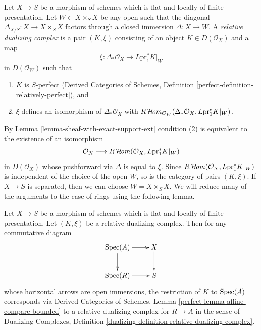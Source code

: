 \begin{definition}
\label{definition-relative-dualizing-complex}
Let $X \to S$ be a morphism of schemes which is flat and
locally of finite presentation. Let $W \subset X \times_S X$
be any open such that the diagonal $\Delta_{X/S} : X \to X \times_S X$
factors through a closed immersion $\Delta : X \to W$.
A {\it relative dualizing complex} is a
pair $(K, \xi)$ consisting of an object $K \in D(\mathcal{O}_X)$
and a map
$$
\xi : \Delta_*\mathcal{O}_X \longrightarrow L\text{pr}_1^*K|_W
$$
in $D(\mathcal{O}_W)$ such that
\begin{enumerate}
\item $K$ is $S$-perfect (Derived Categories of Schemes, Definition
\ref{perfect-definition-relatively-perfect}), and
\item $\xi$ defines an isomorphism of $\Delta_*\mathcal{O}_X$
with
$R\mathop{\mathcal{H}\!\mathit{om}}\nolimits_{\mathcal{O}_W}(
\Delta_*\mathcal{O}_X, L\text{pr}_1^*K|_W)$.
\end{enumerate}
\end{definition}

\noindent
By Lemma \ref{lemma-sheaf-with-exact-support-ext} condition (2)
is equivalent to the existence of an isomorphism
$$
\mathcal{O}_X \longrightarrow
R\mathop{\mathcal{H}\!\mathit{om}}\nolimits(\mathcal{O}_X, L\text{pr}_1^*K|_W)
$$
in $D(\mathcal{O}_X)$ whose pushforward via $\Delta$ is equal to $\xi$.
Since $R\mathop{\mathcal{H}\!\mathit{om}}\nolimits(\mathcal{O}_X, L\text{pr}_1^*K|_W)$ is independent
of the choice of the open $W$, so is the category of pairs $(K, \xi)$.
If $X \to S$ is separated, then we can choose $W = X \times_S X$.
We will reduce many of the arguments to the case of rings
using the following lemma.

\begin{lemma}
\label{lemma-relative-dualizing-complex-algebra}
Let $X \to S$ be a morphism of schemes which is flat and
locally of finite presentation. Let $(K, \xi)$ be a relative
dualizing complex. Then for any commutative diagram
$$
\xymatrix{
\Spec(A) \ar[d] \ar[r] & X \ar[d] \\
\Spec(R) \ar[r] & S
}
$$
whose horizontal arrows are open immersions, the
restriction of $K$ to $\mathop{\mathrm{Spec}}(A)$ corresponds via
Derived Categories of Schemes, Lemma
\ref{perfect-lemma-affine-compare-bounded}
to a relative dualizing complex for $R \to A$
in the sense of Dualizing Complexes, Definition
\ref{dualizing-definition-relative-dualizing-complex}.
\end{lemma}


